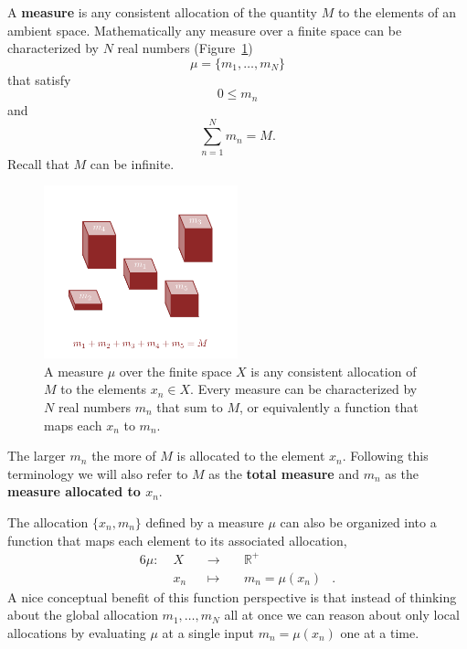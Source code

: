 \documentclass[
  letterpaper,
  DIV=11,
  numbers=noendperiod]{scrartcl}
\begin{document}
A \textbf{measure} is any consistent allocation of the quantity \(M\) to
the elements of an ambient space. Mathematically any measure over a
finite space can be characterized by \(N\) real numbers
(Figure~\ref{fig-measure}) \[
\mu = \{ m_{1}, \ldots, m_{N} \}
\] that satisfy \[
0 \le m_{n}
\] and \[
\sum_{n = 1}^{N} m_{n} = M.
\] Recall that \(M\) can be infinite.

\begin{figure}

{\centering \includegraphics[width=0.5\textwidth,height=\textheight]{figures/measure/measure.pdf}

}

\caption{\label{fig-measure}A measure \(\mu\) over the finite space
\(X\) is any consistent allocation of \(M\) to the elements
\(x_{n} \in X\). Every measure can be characterized by \(N\) real
numbers \(m_{n}\) that sum to \(M\), or equivalently a function that
maps each \(x_{n}\) to \(m_{n}\).}

\end{figure}

The larger \(m_{n}\) the more of \(M\) is allocated to the element
\(x_{n}\). Following this terminology we will also refer to \(M\) as the
\textbf{total measure} and \(m_{n}\) as the \textbf{measure allocated to
\(x_{n}\)}.

The allocation \(\{ x_{n}, m_{n} \}\) defined by a measure \(\mu\) can
also be organized into a function that maps each element to its
associated allocation, \begin{alignat*}{6}
\mu :\; & X & &\rightarrow& \; & \mathbb{R}^{+} &
\\
& x_{n} & &\mapsto& & m_{n} = \mu(x_{n}) &.
\end{alignat*} A nice conceptual benefit of this function perspective is
that instead of thinking about the global allocation
\(m_1, \ldots, m_N\) all at once we can reason about only local
allocations by evaluating \(\mu\) at a single input
\(m_{n} = \mu(x_{n})\) one at a time.
\end{document}
